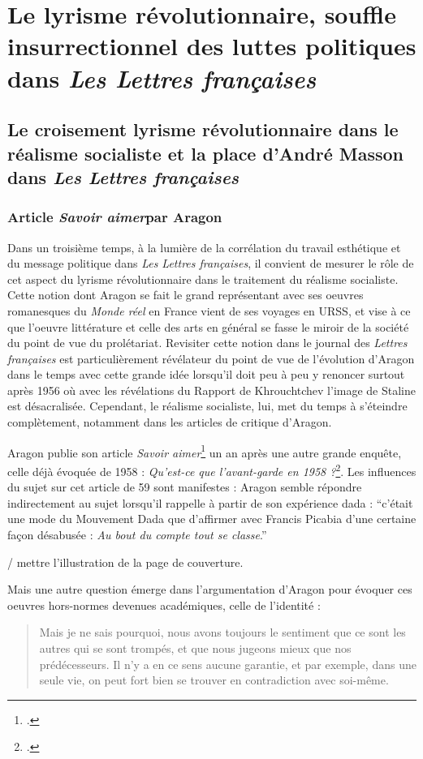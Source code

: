 \chapter{Le lyrisme révolutionnaire, souffle insurrectionnel des luttes politiques dans \emph{Les Lettres françaises} }

\section{Le croisement lyrisme révolutionnaire dans le réalisme socialiste et la place d’André Masson dans \emph{Les Lettres françaises}}

\subsection{Article \emph{Savoir aimer}par Aragon}
 

Dans un troisième temps, à la lumière de la corrélation du travail esthétique et du message politique dans \emph{Les Lettres françaises}, il convient de mesurer le rôle de cet aspect du lyrisme révolutionnaire dans le traitement du réalisme socialiste. Cette notion dont Aragon se fait le grand représentant avec ses oeuvres romanesques du \emph{Monde réel} en France vient de ses voyages en URSS, et vise à ce que l’oeuvre littérature et celle des arts en général se fasse le miroir de la société du point de vue du prolétariat. Revisiter cette notion dans le journal des \emph{Lettres françaises} est particulièrement révélateur du point de vue de l’évolution d’Aragon dans le temps avec cette grande idée lorsqu’il doit peu à peu y renoncer surtout après 1956 où avec les révélations du Rapport de Khrouchtchev l’image de Staline est désacralisée. Cependant, le réalisme socialiste, lui, met du temps à s’éteindre complètement, notamment dans les articles de critique d’Aragon. 

	 Aragon publie son article \emph{Savoir aimer}\footcite{savoiraimer} un an après une autre grande enquête, celle déjà évoquée de 1958 : \emph{Qu’est-ce que l’avant-garde en 1958 ?}\footcite{avantgarde}. Les influences du sujet sur cet article de 59 sont manifestes : Aragon semble répondre indirectement au sujet lorsqu’il rappelle à partir de son expérience dada : \enquote{c’était une mode du Mouvement Dada que d’affirmer avec Francis Picabia d’une certaine façon désabusée : \emph{Au bout du compte tout se classe}.}

 / mettre l'illustration de la page de couverture. 

 Mais une autre question émerge dans l’argumentation d’Aragon pour évoquer ces oeuvres hors-normes devenues académiques, celle de l’identité :  
 \begin{quote}
  Mais je ne sais pourquoi, nous avons toujours le sentiment que ce sont les autres qui se sont trompés, et que nous jugeons mieux que nos prédécesseurs. Il n’y a en ce sens aucune garantie, et par exemple, dans une seule vie, on peut fort bien se trouver en contradiction avec soi-même.    
 \end{quote}


